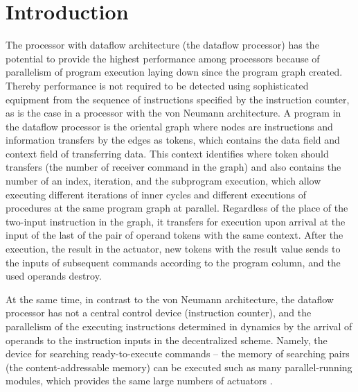 \documentclass[
11pt,%
tightenlines,%
twoside,%
onecolumn,%
nofloats,%
nobibnotes,%
nofootinbib,%
superscriptaddress,%
noshowpacs,%
centertags]%
{revtex4}
\begin{document}


\maketitle

\section{Introduction}

The processor with dataflow architecture (the dataflow processor) has the potential to provide the highest performance among processors because of parallelism of program execution laying down since the program graph created.
Thereby performance is not required to be detected using sophisticated equipment from the sequence of instructions specified by the instruction counter, as is the case in a processor with the von Neumann architecture.
A program in the dataflow processor is the oriental graph where nodes are instructions and information transfers by the edges as tokens, which contains the data field and context field of transferring data.
This context identifies where token should transfers (the number of receiver command in the graph) and also contains the number of an index, iteration, and the subprogram execution, which allow executing different iterations of inner cycles and different executions of procedures at the same program graph at parallel.
Regardless of the place of the two-input instruction in the graph, it transfers for execution upon arrival at the input of the last of the pair of operand tokens with the same context.
After the execution, the result in the actuator, new tokens with the result value sends to the inputs of subsequent commands according to the program column, and the used operands destroy.

At the same time, in contrast to the von Neumann architecture, the dataflow processor has not a central control device (instruction counter), and the parallelism of the executing instructions determined in dynamics by the arrival of operands to the instruction inputs in the decentralized scheme.
Namely, the device for searching ready-to-execute commands -- the memory of searching pairs (the content-addressable memory) can be executed such as many parallel-running modules, which provides the same large numbers of actuators \cite{fine-grained-prl}.
\end{document}
